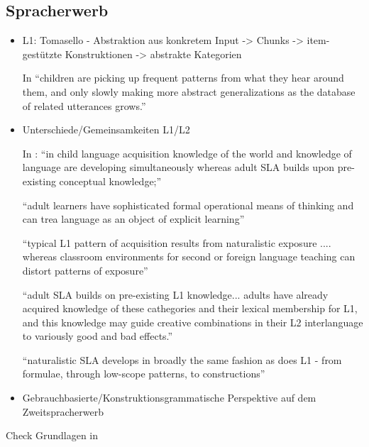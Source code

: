 \subsection{Spracherwerb}
\begin{itemize}
    \item L1: Tomasello - Abstraktion aus konkretem Input -> Chunks -> item-gestützte Konstruktionen -> abstrakte Kategorien

        In \cite{Ellis08} ``children are picking up frequent patterns from what they hear around them, and only slowly making more abstract generalizations as the database of related utterances grows.''
    \item Unterschiede/Gemeinsamkeiten L1/L2

        In \cite{Ellis08}: ``in child language acquisition knowledge of the world and knowledge of language are developing simultaneously whereas adult SLA builds upon pre-existing conceptual knowledge;''

        ``adult learners have sophisticated formal operational means of thinking and can trea language as an object of explicit learning''

        ``typical L1 pattern of acquisition results from naturalistic exposure .... whereas classroom environments for second or foreign language teaching can distort patterns of exposure''

        ``adult SLA builds on pre-existing L1 knowledge... adults have already acquired knowledge of these cathegories and their lexical membership for L1, and this knowledge may guide creative combinations in their L2 interlanguage to variously good and bad effects.''

        ``naturalistic SLA develops in broadly the same fashion as does L1 - from formulae, through low-scope patterns, to constructions''
    \item Gebrauchbasierte/Konstruktionsgrammatische Perspektive auf dem Zweitspracherwerb
\end{itemize}


Check Grundlagen in \cite{Ziem13}
